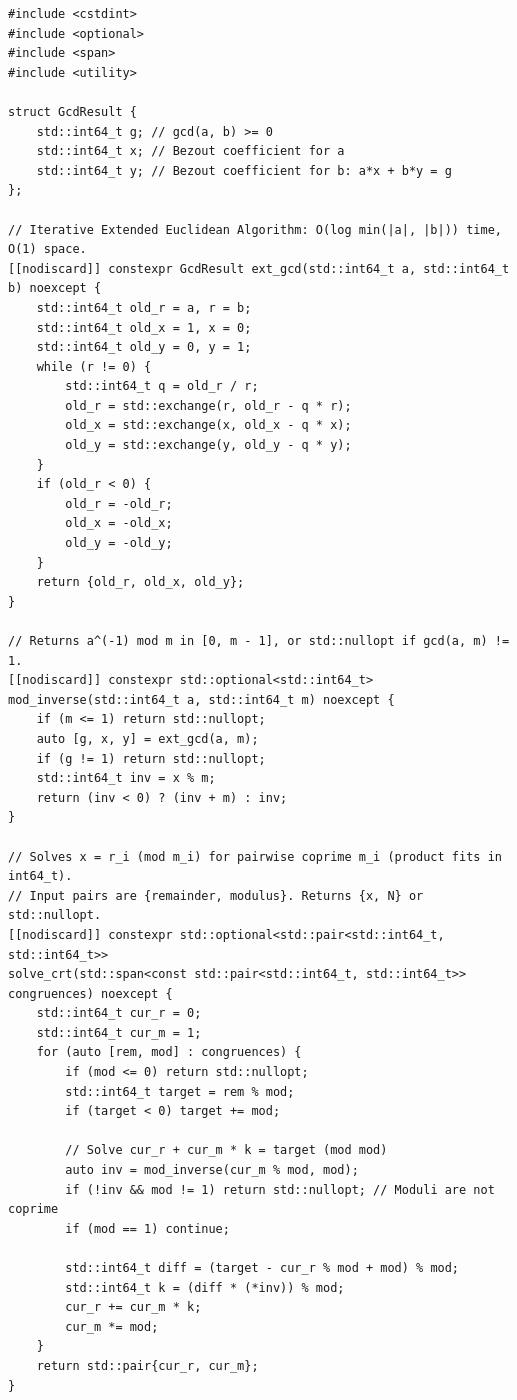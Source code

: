 \documentclass[11pt,a4paper]{article}
\theoremstyle{definition}
\begin{document}
\begin{lstlisting}[caption={Standalone Extended Euclid, Modular Inverse, and Pairwise CRT Solver}]
#include <cstdint>
#include <optional>
#include <span>
#include <utility>

struct GcdResult {
    std::int64_t g; // gcd(a, b) >= 0
    std::int64_t x; // Bezout coefficient for a
    std::int64_t y; // Bezout coefficient for b: a*x + b*y = g
};

// Iterative Extended Euclidean Algorithm: O(log min(|a|, |b|)) time, O(1) space.
[[nodiscard]] constexpr GcdResult ext_gcd(std::int64_t a, std::int64_t b) noexcept {
    std::int64_t old_r = a, r = b;
    std::int64_t old_x = 1, x = 0;
    std::int64_t old_y = 0, y = 1;
    while (r != 0) {
        std::int64_t q = old_r / r;
        old_r = std::exchange(r, old_r - q * r);
        old_x = std::exchange(x, old_x - q * x);
        old_y = std::exchange(y, old_y - q * y);
    }
    if (old_r < 0) {
        old_r = -old_r;
        old_x = -old_x;
        old_y = -old_y;
    }
    return {old_r, old_x, old_y};
}

// Returns a^(-1) mod m in [0, m - 1], or std::nullopt if gcd(a, m) != 1.
[[nodiscard]] constexpr std::optional<std::int64_t>
mod_inverse(std::int64_t a, std::int64_t m) noexcept {
    if (m <= 1) return std::nullopt;
    auto [g, x, y] = ext_gcd(a, m);
    if (g != 1) return std::nullopt;
    std::int64_t inv = x % m;
    return (inv < 0) ? (inv + m) : inv;
}

// Solves x = r_i (mod m_i) for pairwise coprime m_i (product fits in int64_t).
// Input pairs are {remainder, modulus}. Returns {x, N} or std::nullopt.
[[nodiscard]] constexpr std::optional<std::pair<std::int64_t, std::int64_t>>
solve_crt(std::span<const std::pair<std::int64_t, std::int64_t>> congruences) noexcept {
    std::int64_t cur_r = 0;
    std::int64_t cur_m = 1;
    for (auto [rem, mod] : congruences) {
        if (mod <= 0) return std::nullopt;
        std::int64_t target = rem % mod;
        if (target < 0) target += mod;

        // Solve cur_r + cur_m * k = target (mod mod)
        auto inv = mod_inverse(cur_m % mod, mod);
        if (!inv && mod != 1) return std::nullopt; // Moduli are not coprime
        if (mod == 1) continue;

        std::int64_t diff = (target - cur_r % mod + mod) % mod;
        std::int64_t k = (diff * (*inv)) % mod;
        cur_r += cur_m * k;
        cur_m *= mod;
    }
    return std::pair{cur_r, cur_m};
}
\end{lstlisting}
\end{document}
